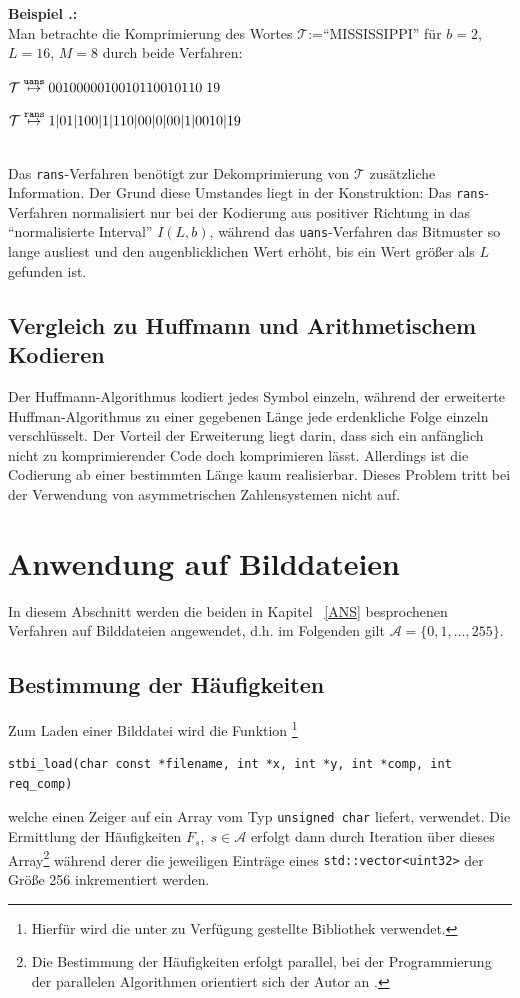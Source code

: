 \documentclass[a4paper,12pt]{article}
\newcommand{\A}{\mathcal A}
\newcounter{Beispiel}
\newcounter{Algorithmus}
\newenvironment{Beispiel}{
\medskip
        
        \setlength{\parindent}{0pt}
        \addtocounter{Beispiel}{1}
        \textbf{\textsf{Beispiel \thesubsection.\theBeispiel}:}\\}{
        \nopagebreak
        \vspace{-1.0ex}
        \bigskip
        
}
\begin{document}
\begin{Beispiel}
Man betrachte die Komprimierung des Wortes $\mathcal{T}$:="`MISSISSIPPI"'  für $b=2$, $L=16$, $M=8$ durch beide Verfahren:
\par
\vspace{0.5cm}
\begin{minipage}[h]{.5\textwidth}
$\mathcal{T}\stackrel{{\tt{uans}}}{\mapsto} 0010000010010110010110\;19$
\end{minipage}
\hfill
 \begin{minipage}[h]{.5\textwidth}
$\mathcal{T}\stackrel{{\tt{rans}}}{\mapsto} 1|01|100|1|110|00|0|00|1|0010|19$
\end{minipage}   
\vspace{0.5cm}
\\
Das {\tt{rans}}-Verfahren benötigt zur Dekomprimierung von $\mathcal{T}$ zusätzliche Information. Der Grund diese Umstandes liegt in der Konstruktion: Das {\tt{rans}}-Verfahren normalisiert nur bei der Kodierung aus positiver Richtung in das "`normalisierte Interval"' $I(L,b)$, während das {\tt{uans}}-Verfahren das Bitmuster so lange ausliest und den augenblicklichen Wert erhöht, bis ein Wert größer als $L$ gefunden ist.
\end{Beispiel}

\subsection{Vergleich zu Huffmann und Arithmetischem Kodieren}
Der Huffmann-Algorithmus kodiert jedes Symbol einzeln, während der erweiterte Huffman-Algorithmus zu einer gegebenen Länge jede erdenkliche Folge einzeln verschlüsselt. Der Vorteil der Erweiterung liegt darin, dass sich ein anfänglich nicht zu komprimierender Code doch komprimieren lässt. Allerdings ist die Codierung ab einer bestimmten Länge kaum realisierbar. Dieses Problem tritt bei der Verwendung von asymmetrischen Zahlensystemen nicht auf.

\newpage
\section{Anwendung auf Bilddateien}
In diesem Abschnitt werden die beiden in Kapitel ~\ref{ANS} besprochenen Verfahren auf Bilddateien angewendet, d.h. im Folgenden gilt $\A=\{0,1,\ldots,255\}$.  
\subsection{Bestimmung der Häufigkeiten}
Zum Laden einer Bilddatei wird die Funktion \footnote{Hierfür wird die unter \cite{Barret} zu Verfügung gestellte Bibliothek verwendet.} 
\begin{verbatim}
stbi_load(char const *filename, int *x, int *y, int *comp, int req_comp)
\end{verbatim}
 welche einen Zeiger auf ein Array vom Typ {\tt{unsigned char}} liefert, verwendet.
Die Ermittlung der Häufigkeiten $F_{s},\;s\in\A$  erfolgt dann durch Iteration über dieses Array\footnote{Die Bestimmung der Häufigkeiten erfolgt parallel, bei der Programmierung der parallelen Algorithmen orientiert sich der Autor an \cite{Williams}.} während derer die jeweiligen Einträge eines {\tt{std::vector<uint32>}} der Größe 256 inkrementiert werden.
\end{document}
